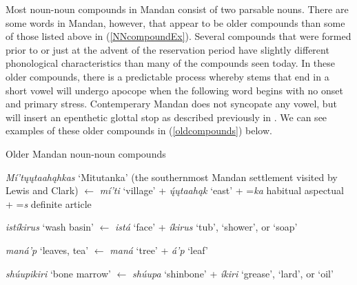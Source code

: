 Most noun-noun compounds in Mandan consist of two parsable nouns. There are some words in Mandan, however, that appear to be older compounds than some of those listed above in (\ref{NNcompoundEx}). Several compounds that were formed prior to or just at the advent of the reservation period have slightly different phonological characteristics than many of the compounds seen today. In these older compounds, there is a predictable process whereby stems that end in a short vowel will undergo apocope when the following word begins with no onset and primary stress. Contemperary Mandan does not syncopate any vowel, but will insert an epenthetic glottal stop as described previously in . We can see examples of these older compounds in (\ref{oldcompounds}) below.

\newpage

\begin{exe}

\item\label{oldcompounds} Older Mandan noun-noun compounds

\begin{xlist}

\item\label{oldcompounds1} \textit{Mí'tųųtaahąhkas} `Mitutanka' (the southernmost Mandan settlement visited by Lewis and Clark)  $\leftarrow$ \textit{mí'ti} `village' + \textit{ų́ųtaahąk} `east' + =\textit{ka} habitual aspectual + =\textit{s} definite article

\item\label{oldcompounds2} \textit{istíkirus} `wash basin' $\leftarrow$ \textit{istá} `face' + \textit{íkirus} `tub', `shower', or `soap'

\item\label{oldcompounds3} \textit{maná'p} `leaves, tea' $\leftarrow$ \textit{maná} `tree' + \textit{á'p} `leaf'

\item\label{oldcompounds4} \textit{shúupikiri} `bone marrow' $\leftarrow$ \textit{shúupa} `shinbone' + \textit{íkiri} `grease', `lard', or `oil'

\end{xlist}


\end{exe}

